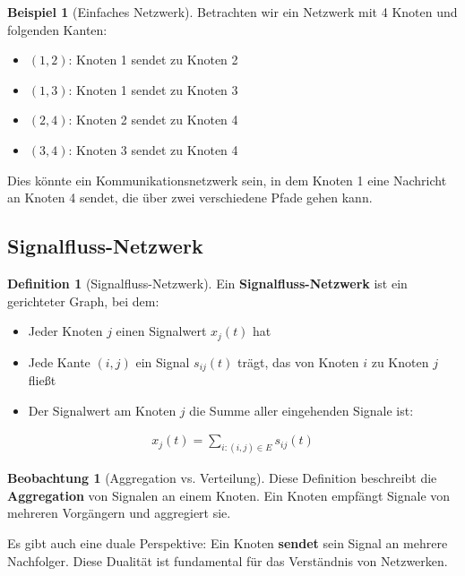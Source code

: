 ﻿\documentclass[a4paper,12pt]{report}
\theoremstyle{definition}
\newtheorem{definition}{Definition}
\newtheorem{beispiel}{Beispiel}
\newtheorem{beobachtung}{Beobachtung}
\begin{document}
	\begin{beispiel}[Einfaches Netzwerk]
		Betrachten wir ein Netzwerk mit 4 Knoten und folgenden Kanten:
		\begin{itemize}
			\item[-] $(1,2)$: Knoten 1 sendet zu Knoten 2
			\item[-] $(1,3)$: Knoten 1 sendet zu Knoten 3
			\item[-] $(2,4)$: Knoten 2 sendet zu Knoten 4
			\item[-] $(3,4)$: Knoten 3 sendet zu Knoten 4
		\end{itemize}
		
		Dies könnte ein Kommunikationsnetzwerk sein, in dem Knoten 1 eine Nachricht an Knoten 4 sendet, die über zwei verschiedene Pfade gehen kann.
	\end{beispiel}
	
	\subsection{Signalfluss-Netzwerk}
	
	\begin{definition}[Signalfluss-Netzwerk]
		Ein \textbf{Signalfluss-Netzwerk} ist ein gerichteter Graph, bei dem:
		\begin{itemize}
			\item[-] Jeder Knoten $j$ einen Signalwert $x_j(t)$ hat
			\item[-] Jede Kante $(i,j)$ ein Signal $s_{ij}(t)$ trägt, das von Knoten $i$ zu Knoten $j$ fließt
			\item[-] Der Signalwert am Knoten $j$ die Summe aller eingehenden Signale ist:
		\end{itemize}
		
		\begin{align}
			x_j(t) = \sum_{i: (i,j) \in E} s_{ij}(t)
		\end{align}
	\end{definition}
	
	\begin{beobachtung}[Aggregation vs. Verteilung]
		Diese Definition beschreibt die \textbf{Aggregation} von Signalen an einem Knoten. Ein Knoten empfängt Signale von mehreren Vorgängern und aggregiert sie.
		
		Es gibt auch eine duale Perspektive: Ein Knoten \textbf{sendet} sein Signal an mehrere Nachfolger. Diese Dualität ist fundamental für das Verständnis von Netzwerken.
	\end{beobachtung}
	
\end{document}
